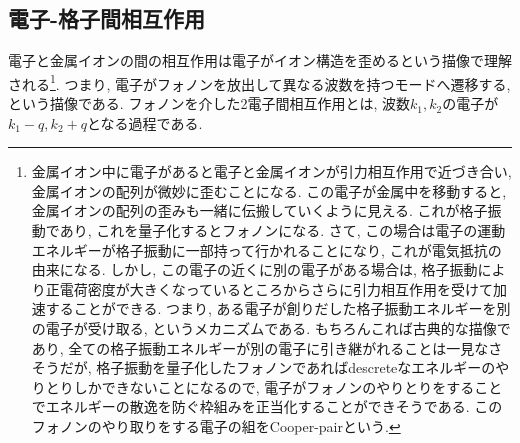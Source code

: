 \documentclass[10.5pt,a4paper]{jreport}
\begin{document}
\subsection{電子-格子間相互作用}
電子と金属イオンの間の相互作用は電子がイオン構造を歪めるという描像で理解される\footnote{金属イオン中に電子があると電子と金属イオンが引力相互作用で近づき合い, 金属イオンの配列が微妙に歪むことになる. この電子が金属中を移動すると, 金属イオンの配列の歪みも一緒に伝搬していくように見える. これが格子振動であり, これを量子化するとフォノンになる. さて, この場合は電子の運動エネルギーが格子振動に一部持って行かれることになり, これが電気抵抗の由来になる. しかし, この電子の近くに別の電子がある場合は, 格子振動により正電荷密度が大きくなっているところからさらに引力相互作用を受けて加速することができる. つまり, ある電子が創りだした格子振動エネルギーを別の電子が受け取る, というメカニズムである. もちろんこれば古典的な描像であり, 全ての格子振動エネルギーが別の電子に引き継がれることは一見なさそうだが, 格子振動を量子化したフォノンであればdescreteなエネルギーのやりとりしかできないことになるので, 電子がフォノンのやりとりをすることでエネルギーの散逸を防ぐ枠組みを正当化することができそうである. このフォノンのやり取りをする電子の組をCooper-pairという. }. つまり, 電子がフォノンを放出して異なる波数を持つモードへ遷移する, という描像である. フォノンを介した2電子間相互作用とは, 波数$k_1, k_2$の電子が$k_1 - q, k_2 + q$となる過程である.
\end{document}
